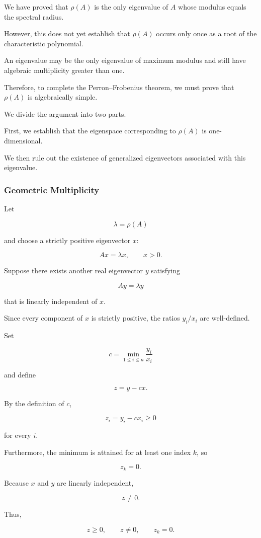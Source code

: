 \documentclass[11pt,a4paper]{article}
\theoremstyle{definition}
\theoremstyle{remark}
\begin{document}
We have proved that $\rho(A)$
is the only eigenvalue of $A$
whose modulus equals the
spectral radius.

However, this does not yet
establish that $\rho(A)$
occurs only once as a root
of the characteristic polynomial.

An eigenvalue may be the
only eigenvalue of maximum
modulus and still have
algebraic multiplicity
greater than one.

Therefore, to complete
the Perron--Frobenius theorem,
we must prove that
$\rho(A)$ is algebraically simple.

We divide the argument
into two parts.

First, we establish that
the eigenspace corresponding
to $\rho(A)$ is
one-dimensional.

We then rule out the
existence of generalized
eigenvectors associated
with this eigenvalue.
\subsubsection{Geometric Multiplicity}

Let

\[
\lambda=\rho(A)
\]

and choose a strictly
positive eigenvector $x$:

\[
Ax=\lambda x,
\qquad x>0.
\]

Suppose there exists another
real eigenvector $y$ satisfying

\[
Ay=\lambda y
\]

that is linearly independent
of $x$.

Since every component of
$x$ is strictly positive,
the ratios $y_i/x_i$
are well-defined.

Set

\[
c=
\min_{1\leq i\leq n}
\frac{y_i}{x_i}
\]

and define

\[
z=y-cx.
\]

By the definition of $c$,

\[
z_i=y_i-cx_i\geq0
\]

for every $i$.

Furthermore, the minimum
is attained for at least
one index $k$, so

\[
z_k=0.
\]

Because $x$ and $y$
are linearly independent,

\[
z\neq0.
\]

Thus,

\[
z\geq0,
\qquad z\neq0,
\qquad z_k=0.
\]
\end{document}
